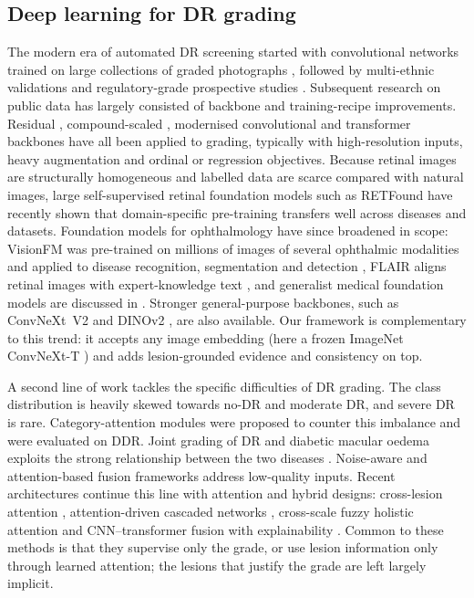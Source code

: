 \subsection{Deep learning for DR grading}
The modern era of automated DR screening started with convolutional networks trained on large collections of graded photographs \citep{gulshan2016}, followed by multi-ethnic validations \citep{ting2017} and regulatory-grade prospective studies \citep{abramoff2018}. Subsequent research on public data has largely consisted of backbone and training-recipe improvements. Residual \citep{he2016resnet}, compound-scaled \citep{tan2019efficientnet}, modernised convolutional \citep{liu2022convnext} and transformer backbones \citep{dosovitskiy2021vit,liu2021swin} have all been applied to grading, typically with high-resolution inputs, heavy augmentation and ordinal or regression objectives. Because retinal images are structurally homogeneous and labelled data are scarce compared with natural images, large self-supervised retinal foundation models such as RETFound \citep{zhou2023retfound} have recently shown that domain-specific pre-training transfers well across diseases and datasets. Foundation models for ophthalmology have since broadened in scope: VisionFM was pre-trained on millions of images of several ophthalmic modalities and applied to disease recognition, segmentation and detection \citep{qiu2024visionfm}, FLAIR aligns retinal images with expert-knowledge text \citep{silva2025flair}, and generalist medical foundation models are discussed in \citet{moor2023generalist}. Stronger general-purpose backbones, such as ConvNeXt~V2 \citep{woo2023convnextv2} and DINOv2 \citep{oquab2024dinov2}, are also available. Our framework is complementary to this trend: it accepts any image embedding (here a frozen ImageNet ConvNeXt-T \citep{liu2022convnext}) and adds lesion-grounded evidence and consistency on top.

A second line of work tackles the specific difficulties of DR grading. The class distribution is heavily skewed towards no-DR and moderate DR, and severe DR is rare. Category-attention modules \citep{he2021cabnet} were proposed to counter this imbalance and were evaluated on DDR. Joint grading of DR and diabetic macular oedema exploits the strong relationship between the two diseases \citep{li2020canet}. Noise-aware and attention-based fusion frameworks \citep{lin2018antinoise} address low-quality inputs. Recent architectures continue this line with attention and hybrid designs: cross-lesion attention \citep{liu2023crosslesion}, attention-driven cascaded networks \citep{yue2023cascaded}, cross-scale fuzzy holistic attention \citep{lin2025cfhan} and CNN--transformer fusion with explainability \citep{ikram2025resvit}. Common to these methods is that they supervise only the grade, or use lesion information only through learned attention; the lesions that justify the grade are left largely implicit.

